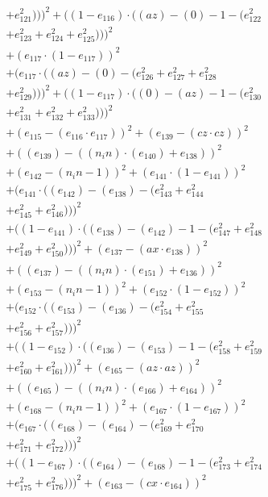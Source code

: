 \documentclass[10pt, a4paper]{article}
\begin{document}
\begin{small}
\begin{align*}
& + e_{121}^{2})))^{2} + ((1 - e_{116})  \cdot  ((az) - (0) - 1 - (e_{122}^{2} \\
& + e_{123}^{2} + e_{124}^{2} + e_{125}^{2})))^{2} \\
& + (e_{117}  \cdot  (1 - e_{117}))^{2} \\
& + (e_{117}  \cdot  ((az) - (0) - (e_{126}^{2} + e_{127}^{2} + e_{128}^{2} \\
& + e_{129}^{2})))^{2} + ((1 - e_{117})  \cdot  ((0) - (az) - 1 - (e_{130}^{2} \\
& + e_{131}^{2} + e_{132}^{2} + e_{133}^{2})))^{2} \\
& + (e_{115} - (e_{116}  \cdot  e_{117}))^{2} + (e_{139} - (cz  \cdot  cz))^{2} \\
& + ((e_{139}) - ((n_in)  \cdot  (e_{140}) + e_{138}))^{2} \\
& + (e_{142} - (n_in - 1))^{2} + (e_{141}  \cdot  (1 - e_{141}))^{2} \\
& + (e_{141}  \cdot  ((e_{142}) - (e_{138}) - (e_{143}^{2} + e_{144}^{2} \\
& + e_{145}^{2} + e_{146}^{2})))^{2} \\
& + ((1 - e_{141})  \cdot  ((e_{138}) - (e_{142}) - 1 - (e_{147}^{2} + e_{148}^{2} \\
& + e_{149}^{2} + e_{150}^{2})))^{2} + (e_{137} - (ax  \cdot  e_{138}))^{2} \\
& + ((e_{137}) - ((n_in)  \cdot  (e_{151}) + e_{136}))^{2} \\
& + (e_{153} - (n_in - 1))^{2} + (e_{152}  \cdot  (1 - e_{152}))^{2} \\
& + (e_{152}  \cdot  ((e_{153}) - (e_{136}) - (e_{154}^{2} + e_{155}^{2} \\
& + e_{156}^{2} + e_{157}^{2})))^{2} \\
& + ((1 - e_{152})  \cdot  ((e_{136}) - (e_{153}) - 1 - (e_{158}^{2} + e_{159}^{2} \\
& + e_{160}^{2} + e_{161}^{2})))^{2} + (e_{165} - (az  \cdot  az))^{2} \\
& + ((e_{165}) - ((n_in)  \cdot  (e_{166}) + e_{164}))^{2} \\
& + (e_{168} - (n_in - 1))^{2} + (e_{167}  \cdot  (1 - e_{167}))^{2} \\
& + (e_{167}  \cdot  ((e_{168}) - (e_{164}) - (e_{169}^{2} + e_{170}^{2} \\
& + e_{171}^{2} + e_{172}^{2})))^{2} \\
& + ((1 - e_{167})  \cdot  ((e_{164}) - (e_{168}) - 1 - (e_{173}^{2} + e_{174}^{2} \\
& + e_{175}^{2} + e_{176}^{2})))^{2} + (e_{163} - (cx  \cdot  e_{164}))^{2} \\

\end{align*}
\end{small}
\end{document}
